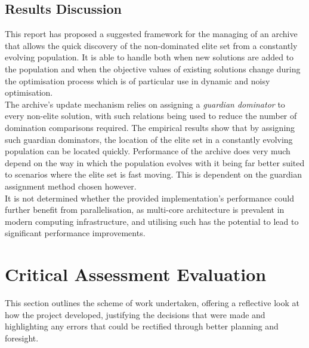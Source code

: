 \documentclass{ecmm427_assignment}
\begin{document}

\subsection{Results Discussion}

This report has proposed a suggested framework for the managing of an archive that allows the quick discovery of the non-dominated elite set from a constantly evolving population. It is able to handle both when new solutions are added to the population and when the objective values of existing solutions change during the optimisation process which is of particular use in dynamic and noisy optimisation.\\
The archive's update mechanism relies on assigning a \textit{guardian dominator} to every non-elite solution, with such relations being used to reduce the number of domination comparisons required. 
The empirical results show that by assigning such guardian dominators, the location of the elite set in a constantly evolving population can be located quickly. Performance of the archive does very much depend on the way in which the population evolves with it being far better suited to scenarios where the elite set is fast moving. This is dependent on the guardian assignment method chosen however.\\
It is not determined whether the provided implementation's performance could further benefit from parallelisation, as multi-core architecture is prevalent in modern computing infrastructure, and utilising such has the potential to lead to significant performance improvements.

\section{Critical Assessment Evaluation}
This section outlines the scheme of work undertaken, offering a reflective look at how the project developed, justifying the decisions that were made and highlighting any errors that could be rectified through better planning and foresight.
\end{document}
